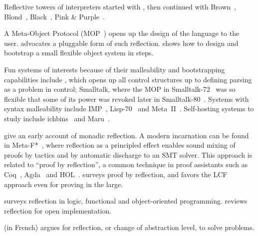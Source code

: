 Reflective towers of interpreters started with \cite{smith-lisp}, then continued with Brown~\citep{brown}, Blond~\citep{blond}, Black~\citep{black,black-gpce}, Pink \& Purple~\citep{collapsing-towers}.

A Meta-Object Protocol (MOP~\citep{Kiczales93metaobjectprotocols}) opens
up the design of the language to the user. \cite{bracha-mirrors}
advocates a pluggable form of such reflection. \cite{oeom} shows how
to design and bootstrap a small flexible object system in steps.

Fun systems of interests because of their malleability and
bootstrapping capabilities include \cite{fisher1970control}, which
opens up all control structures up to defining parsing as a problem in
control; Smalltalk, where the MOP in Smalltalk-72~\citep{smalltalk-72} was so flexible that
some of its power was revoked later in Smalltalk-80~\citep{smalltalk-80}.
Systems with
syntax malleability include IMP~\citep{imp},
Lisp-70~\citep{testerlisp70}
and Meta~II~\citep{meta2}. Self-hosting systems to
study include ichbins~\citep{ichbins} and Maru~\citep{maru}.

\cite{sobel} give an early account of monadic reflection. A modern
incarnation can be found in Meta-F*~\citep{meta-fstar}, where
reflection as a principled effect enables sound mixing of proofs by
tactics and by automatic discharge to an SMT solver. This approach is
related to ``proof by reflection'', a common technique in proof
assistants such as Coq~\citep{coq-reflection,coq-reflection2},
Agda~\citep{agda-reflection,agda-stump,agda-reflection-eng} and HOL~\citep{hol-reflection}. \cite{harrison-reflection} surveys proof by reflection, and favors the LCF approach even for proving in the large.

\cite{malenfant} surveys reflection in logic, functional and object-oriented programming. \cite{tanter} reviews reflection for open implementation.

\cite{metaconnaissances} (in French) argues for reflection, or change
of abstraction level, to solve problems.
